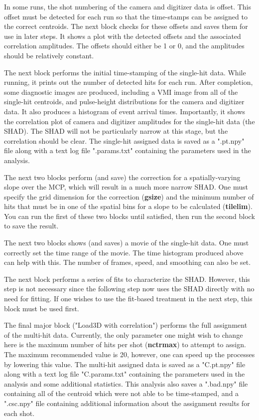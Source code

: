 \documentclass[12pt]{article}
\begin{document}
In some runs, the shot numbering of the camera and digitizer data is offset.
This offset must be detected for each run so that the time-stamps can be assigned to the correct centroids.
The next block checks for these offsets and saves them for use in later steps.
It shows a plot with the detected offsets and the associated correlation amplitudes.
The offsets should either be 1 or 0, and the amplitudes should be relatively constant.

The next block performs the initial time-stamping of the single-hit data.
While running, it prints out the number of detected hits for each run.
After completion, some diagnostic images are produced, including a VMI image from all of the single-hit centroids, and pulse-height distributions for the camera and digitizer data.
It also produces a histogram of event arrival times.
Importantly, it shows the correlation plot of camera and digitizer amplitudes for the single-hit data (the SHAD).
The SHAD will not be particularly narrow at this stage, but the correlation should be clear.
The single-hit assigned data is saved as a ".pt.npy" file along with a text log file ".params.txt" containing the parameters used in the analysis.

The next two blocks perform (and save) the correction for a spatially-varying slope over the MCP, which will result in a much more narrow SHAD.
One must specify the grid dimension for the correction (\textbf{gsize}) and the minimum number of hits that must be in one of the spatial bins for a slope to be calculated (\textbf{tilelim}).
You can run the first of these two blocks until satisfied, then run the second block to save the result.

The next two blocks shows (and saves) a movie of the single-hit data.
One must correctly set the time range of the movie.
The time histogram produced above can help with this.
The number of frames, speed, and smoothing can also be set.

The next block performs a series of fits to characterize the SHAD.
However, this step is not necessary since the following step now uses the SHAD directly with no need for fitting.
If one wishes to use the fit-based treatment in the next step, this block must be used first.

The final major block ("Load3D with correlation") performs the full assignment of the multi-hit data.
Currently, the only parameter one might wish to change here is the maximum number of hits per shot (\textbf{nctrmax}) to attempt to assign.
The maximum recommended value is 20, however, one can speed up the processes by lowering this value.
The multi-hit assigned data is saved as a "C.pt.npy" file along with a text log file "C.params.txt" containing the parameters used in the analysis and some additional statistics.
This analysis also saves a ".bad.npy" file containing all of the centroid which were not able to be time-stamped, and a ".csc.npy" file containing additional information about the assignment results for each shot.
\end{document}
